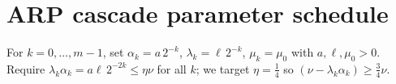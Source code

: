 \section{ARP cascade parameter schedule}\label{sec:param_schedule}
For $k=0,\dots,m-1$, set $\alpha_k=a\,2^{-k}$, $\lambda_k=\ell\,2^{-k}$, $\mu_k=\mu_0$ with $a,\ell,\mu_0>0$.
Require $\lambda_k\alpha_k=a\ell\,2^{-2k} \le \eta \nu$ for all $k$; we target $\eta=\tfrac14$ so $(\nu-\lambda_k\alpha_k)\ge \tfrac34 \nu$.
